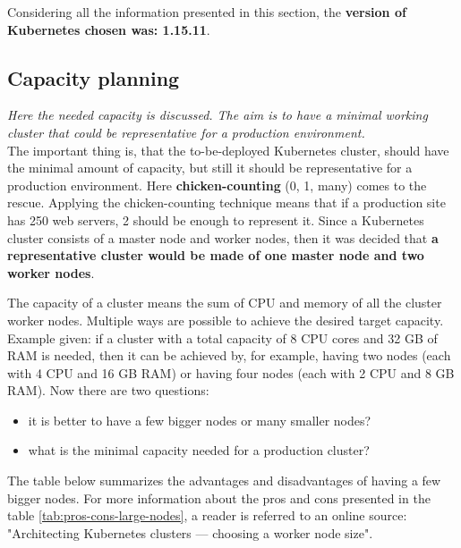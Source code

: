 Considering all the information presented in this section, the \textbf{version of Kubernetes chosen was: 1.15.11}.


\subsection{Capacity planning}
\textit{Here the needed capacity is discussed. The aim is to have a minimal working cluster that could be representative for a production environment.}
\\

The important thing is, that the to-be-deployed Kubernetes cluster, should have the minimal amount of capacity, but still it should be representative for a production environment. Here \textbf{chicken-counting} (0, 1, many) comes to the rescue. Applying the chicken-counting technique means that if a production site has 250 web servers, 2 should be enough to represent it\cite{book-cicd}. Since a Kubernetes cluster consists of a master node and worker nodes, then it was decided that \textbf{a representative cluster would be made of one master node and two worker nodes}.

The capacity of a cluster means the sum of CPU and memory of all the cluster worker nodes. Multiple ways are possible to achieve the desired target capacity. Example given: if a cluster with a total capacity of 8 CPU cores and 32 GB of RAM is needed, then it can be achieved by, for example, having two nodes (each with 4 CPU and 16 GB RAM) or having four nodes (each with 2 CPU and 8 GB RAM)\cite{kubernetes-node-size}. Now there are two questions:
\begin{itemize}
\item it is better to have a few bigger nodes or many smaller nodes?
\item what is the minimal capacity needed for a production cluster?
\end{itemize}

The table below summarizes the advantages and disadvantages of having a few bigger nodes. For more information about the pros and cons presented in the table \ref{tab:pros-cons-large-nodes}, a reader is referred to an online source: "Architecting Kubernetes clusters — choosing a worker node size"\cite{kubernetes-node-size}.

